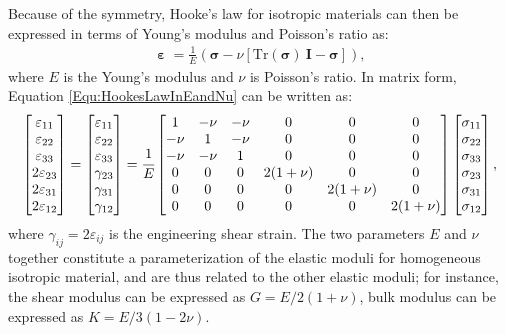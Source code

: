 Because of the symmetry, Hooke's law for isotropic materials can then be expressed in terms of Young's modulus and Poisson's ratio as:
\begin{eqnarray}
   \boldsymbol{\upepsilon} = \frac{1}{E}(\boldsymbol{\sigma} - \nu[\mathrm{Tr}(\boldsymbol{\sigma})~\mathbf{I} - \boldsymbol{\sigma}]),
\label{Equ:HookesLawInEandNu}
\end{eqnarray}
where $E$ is the Young's modulus and $\nu$ is Poisson's ratio.
In matrix form, Equation \ref{Equ:HookesLawInEandNu} can be written as:
\begin{eqnarray}
   \begin{bmatrix}\varepsilon_{11} \\ \varepsilon_{22} \\ \varepsilon_{33} \\ 2\varepsilon_{23} \\ 2\varepsilon_{31} \\ 2\varepsilon_{12} \end{bmatrix} =
   \begin{bmatrix}\varepsilon_{11} \\ \varepsilon_{22} \\ \varepsilon_{33} \\ \gamma_{23} \\ \gamma_{31} \\ \gamma_{12} \end{bmatrix} =
   \cfrac{1}{E}
   \begin{bmatrix} 1 & -\nu & -\nu & 0 & 0 & 0 \\
                   -\nu & 1 & -\nu & 0 & 0 & 0 \\
                   -\nu & -\nu & 1 & 0 & 0 & 0 \\
                   0 & 0 & 0 & 2(1+\nu) & 0 & 0 \\
                   0 & 0 & 0 & 0 & 2(1+\nu) & 0 \\
                   0 & 0 & 0 & 0 & 0 & 2(1+\nu) \end{bmatrix}
    \begin{bmatrix}\sigma_{11} \\ \sigma_{22} \\ \sigma_{33} \\ \sigma_{23} \\ \sigma_{31} \\ \sigma_{12} \end{bmatrix},
 \end{eqnarray}
where $\gamma_{ij} = 2\varepsilon_{ij}$ is the engineering shear strain.
The two parameters $E$ and $\nu$ together constitute a parameterization of the elastic moduli for homogeneous isotropic material, and are thus related to the other elastic moduli; for instance, the shear modulus can be expressed as $G={E}/{2(1+\nu)}$, bulk modulus can be expressed as $K = {E}/{3(1-2\nu)}$.

